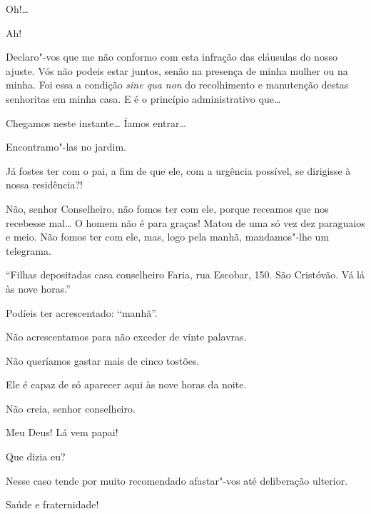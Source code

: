 



 Oh!\ldots{}

  Ah!

 Declaro"-vos que me não conformo com esta infração das cláusulas do
nosso ajuste. Vós não podeis estar juntos, senão na presença de minha mulher ou
na minha. Foi essa a condição \textit{sine qua non} do recolhimento e manutenção
destas senhoritas em minha casa. E é o princípio administrativo que\ldots{}

  Chegamos neste instante\ldots{} Íamos entrar\ldots{}

 Encontramo"-las no jardim. 

 Já fostes ter com o pai, a fim de que ele, com a urgência
possível, se dirigisse à nossa residência?!

 Não, senhor Conselheiro, não fomos ter com ele, porque receamos que
nos recebesse mal\ldots{} O homem não é para graças! Matou de uma só vez dez
paraguaios e meio. Não fomos ter com ele, mas, logo pela manhã, mandamos"-lhe um
telegrama.

 ``Filhas depositadas casa conselheiro Faria, rua Escobar, 150.
São Cristóvão. Vá lá às nove horas.''

 Podíeis ter acrescentado: ``manhã''.

 Não acrescentamos para não exceder de vinte palavras.

 Não queríamos gastar mais de cinco tostões.

 Ele é capaz de só aparecer aqui às nove horas da noite.

 Não creia, senhor conselheiro.

  Meu Deus! Lá vem papai!

 Que dizia eu?

 Nesse caso tende por muito recomendado afastar"-vos até deliberação
ulterior.

  Saúde e fraternidade!


